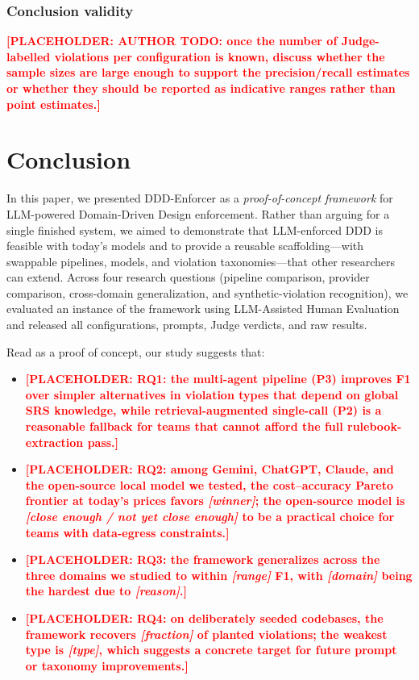 \documentclass[smallextended]{svjour3}
\newcommand{\placeholder}[1]{\textcolor{red}{\textbf{[PLACEHOLDER: #1]}}}
\begin{document}
\subsubsection{Conclusion validity}

\placeholder{AUTHOR TODO: once the number of Judge-labelled violations per configuration is known, discuss whether the sample sizes are large enough to support the precision/recall estimates or whether they should be reported as indicative ranges rather than point estimates.}


\section{Conclusion}
\label{sec:conclusion}

In this paper, we presented DDD-Enforcer as a \emph{proof-of-concept framework} for LLM-powered Domain-Driven Design enforcement.
Rather than arguing for a single finished system, we aimed to demonstrate that LLM-enforced DDD is feasible with today's models and to provide a reusable scaffolding---with swappable pipelines, models, and violation taxonomies---that other researchers can extend.
Across four research questions (pipeline comparison, provider comparison, cross-domain generalization, and synthetic-violation recognition), we evaluated an instance of the framework using LLM-Assisted Human Evaluation and released all configurations, prompts, Judge verdicts, and raw results.

Read as a proof of concept, our study suggests that:
\begin{itemize}
    \item \placeholder{RQ1: the multi-agent pipeline (P3) improves F1 over simpler alternatives in violation types that depend on global SRS knowledge, while retrieval-augmented single-call (P2) is a reasonable fallback for teams that cannot afford the full rulebook-extraction pass.}
    \item \placeholder{RQ2: among Gemini, ChatGPT, Claude, and the open-source local model we tested, the cost--accuracy Pareto frontier at today's prices favors \emph{[winner]}; the open-source model is \emph{[close enough / not yet close enough]} to be a practical choice for teams with data-egress constraints.}
    \item \placeholder{RQ3: the framework generalizes across the three domains we studied to within \emph{[range]} F1, with \emph{[domain]} being the hardest due to \emph{[reason]}.}
    \item \placeholder{RQ4: on deliberately seeded codebases, the framework recovers \emph{[fraction]} of planted violations; the weakest type is \emph{[type]}, which suggests a concrete target for future prompt or taxonomy improvements.}
\end{itemize}
\end{document}
